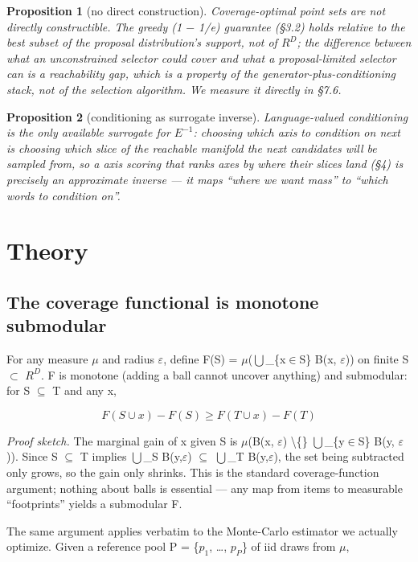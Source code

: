 \documentclass[11pt]{article}
\theoremstyle{plain}
\newtheorem{proposition}{Proposition}
\theoremstyle{definition}
\begin{document}
\begin{proposition}[no direct construction]
Coverage-optimal point sets are not directly constructible. The greedy (1 $-$ 1/e) guarantee (\S{}3.2) holds relative to the best subset of the \emph{proposal distribution's support}, not of $R^{D}$; the difference between what an unconstrained selector could cover and what a proposal-limited selector can is a \emph{reachability gap}, which is a property of the generator-plus-conditioning stack, not of the selection algorithm. We measure it directly in \S{}7.6.
\end{proposition}

\begin{proposition}[conditioning as surrogate inverse]
Language-valued conditioning is the only available surrogate for $E^{-1}$: choosing which axis to condition on next is choosing which \emph{slice} of the reachable manifold the next candidates will be sampled from, so a axis scoring that ranks axes by where their slices land (\S{}4) is precisely an approximate inverse --- it maps ``where we want mass'' to ``which words to condition on''.
\end{proposition}

\section{Theory}
\subsection{The coverage functional is monotone submodular}
For any measure $\mu$ and radius $\varepsilon$, define F(S) = $\mu$($\bigcup$\_\{x$\in$S\} B(x, $\varepsilon$)) on finite S $\subset$ $R^{D}$. F is monotone (adding a ball cannot uncover anything) and submodular: for S $\subseteq$ T and any x,

\[
F(S \cup  {x}) - F(S) \geq  F(T \cup  {x}) - F(T)
\]

\emph{Proof sketch.} The marginal gain of x given S is $\mu$(B(x, $\varepsilon$) \textbackslash\{\} $\bigcup$\_\{y$\in$S\} B(y, $\varepsilon$)). Since S $\subseteq$ T implies $\bigcup$\_S B(y,$\varepsilon$) $\subseteq$ $\bigcup$\_T B(y,$\varepsilon$), the set being subtracted only grows, so the gain only shrinks. This is the standard coverage-function argument; nothing about balls is essential --- any map from items to measurable ``footprints'' yields a submodular F. \qedsymbol

The same argument applies verbatim to the Monte-Carlo estimator we actually optimize. Given a reference pool P = \{$p_{1}$, \ldots{}, $p_{P}$\} of iid draws from $\mu$,
\end{document}
